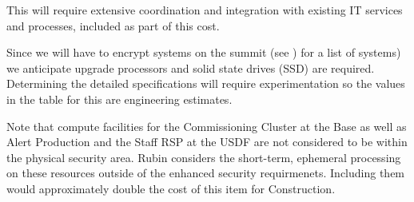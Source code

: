 This will require extensive coordination and integration with existing IT
services and processes, included as part of this cost.

Since we will have to encrypt systems on the summit (see ) for a list of systems)
we anticipate upgrade processors and solid state drives (SSD) are required. Determining the detailed specifications will require experimentation so the
values in the table for this are engineering estimates.

Note that compute facilities for the Commissioning Cluster at the Base as well as Alert Production and the Staff RSP at the USDF are not considered to be within the physical security area.
Rubin considers the short-term, ephemeral processing on these resources outside of the enhanced security requirmenets. Including them would approximately double the cost of this item for Construction.
